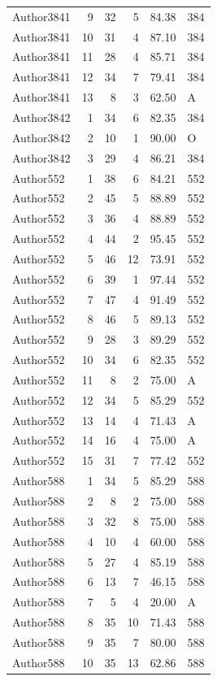 \begin{longtable}{lrrrrl}
Author3841 & 9 & 32 & 5 & 84.38 & 384\\
Author3841 & 10 & 31 & 4 & 87.10 & 384\\
Author3841 & 11 & 28 & 4 & 85.71 & 384\\
Author3841 & 12 & 34 & 7 & 79.41 & 384\\
Author3841 & 13 & 8 & 3 & 62.50 & A\\
Author3842 & 1 & 34 & 6 & 82.35 & 384\\
Author3842 & 2 & 10 & 1 & 90.00 & O\\
Author3842 & 3 & 29 & 4 & 86.21 & 384\\
Author552 & 1 & 38 & 6 & 84.21 & 552\\
Author552 & 2 & 45 & 5 & 88.89 & 552\\
Author552 & 3 & 36 & 4 & 88.89 & 552\\
Author552 & 4 & 44 & 2 & 95.45 & 552\\
Author552 & 5 & 46 & 12 & 73.91 & 552\\
Author552 & 6 & 39 & 1 & 97.44 & 552\\
Author552 & 7 & 47 & 4 & 91.49 & 552\\
Author552 & 8 & 46 & 5 & 89.13 & 552\\
Author552 & 9 & 28 & 3 & 89.29 & 552\\
Author552 & 10 & 34 & 6 & 82.35 & 552\\
Author552 & 11 & 8 & 2 & 75.00 & A\\
Author552 & 12 & 34 & 5 & 85.29 & 552\\
Author552 & 13 & 14 & 4 & 71.43 & A\\
Author552 & 14 & 16 & 4 & 75.00 & A\\
Author552 & 15 & 31 & 7 & 77.42 & 552\\
Author588 & 1 & 34 & 5 & 85.29 & 588\\
Author588 & 2 & 8 & 2 & 75.00 & 588\\
Author588 & 3 & 32 & 8 & 75.00 & 588\\
Author588 & 4 & 10 & 4 & 60.00 & 588\\
Author588 & 5 & 27 & 4 & 85.19 & 588\\
Author588 & 6 & 13 & 7 & 46.15 & 588\\
Author588 & 7 & 5 & 4 & 20.00 & A\\
Author588 & 8 & 35 & 10 & 71.43 & 588\\
Author588 & 9 & 35 & 7 & 80.00 & 588\\
Author588 & 10 & 35 & 13 & 62.86 & 588\\

\end{longtable}
